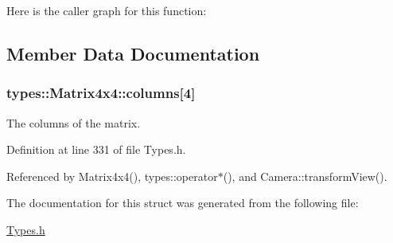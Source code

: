 Here is the caller graph for this function\+:




\subsection{Member Data Documentation}
\hypertarget{structtypes_1_1_matrix4x4_a71eff2a403350446b93f8f11dda7b73e}{}
\subsubsection[{columns}]{ types\+::\+Matrix4x4\+::columns\mbox{[}4\mbox{]}}\label{structtypes_1_1_matrix4x4_a71eff2a403350446b93f8f11dda7b73e}


The columns of the matrix. 



Definition at line 331 of file Types.\+h.



Referenced by Matrix4x4(), types\+::operator$\ast$(), and Camera\+::transform\+View().



The documentation for this struct was generated from the following file\+:\begin{DoxyCompactItemize}
\item 
\hyperlink{_types_8h}{Types.\+h}\end{DoxyCompactItemize}
